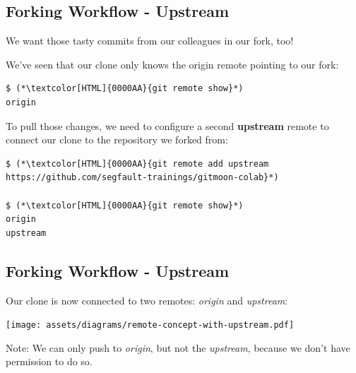 \subsection{Forking Workflow - Upstream}
\begin{frame}[fragile]
  \subslidetitle

  We want those tasty commits from our colleagues in our fork, too!

  We've seen that our clone only knows the origin remote pointing to our fork:

  \begin{lstlisting}
$ (*\textcolor[HTML]{0000AA}{git remote show}*)
origin
\end{lstlisting}

  To pull those changes, we need to configure a second \textbf{upstream} remote
  to connect our clone to the repository we forked from:

  \begin{lstlisting}
$ (*\textcolor[HTML]{0000AA}{git remote add upstream https://github.com/segfault-trainings/gitmoon-colab}*)

$ (*\textcolor[HTML]{0000AA}{git remote show}*)
origin
upstream
\end{lstlisting}

\end{frame}

\subsection{Forking Workflow - Upstream}
\begin{frame}[fragile]
  \subslidetitle

  Our clone is now connected to two remotes: \textit{origin} and \textit{upstream}:

  \vspace{3em}
  \centerline{\texttt{[image: assets/diagrams/remote-concept-with-upstream.pdf]}}

  \vspace{1em}
  Note: We can only push to \textit{origin}, but not the \textit{upstream}, because
  we don't have permission to do so.

\end{frame}

